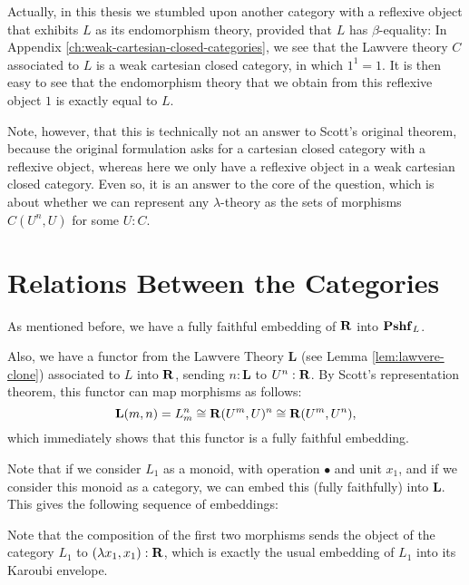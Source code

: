 \begin{remark}
  Actually, in this thesis we stumbled upon another category with a reflexive object that exhibits $ L $ as its endomorphism theory, provided that $ L $ has $ \beta $-equality: In Appendix \ref{ch:weak-cartesian-closed-categories}, we see that the Lawvere theory $ C $ associated to $ L $ is a weak cartesian closed category, in which $ 1^1 = 1 $. It is then easy to see that the endomorphism theory that we obtain from this reflexive object $ 1 $ is exactly equal to $ L $.

  Note, however, that this is technically not an answer to Scott's original theorem, because the original formulation asks for a cartesian closed category with a reflexive object, whereas here we only have a reflexive object in a weak cartesian closed category. Even so, it is an answer to the core of the question, which is about whether we can represent any $ \lambda $-theory as the sets of morphisms $ C(U^n, U) $ for some $ U : C $.
\end{remark}

\section{Relations Between the Categories}\label{sec:hyland-categories}

As mentioned before, we have a fully faithful embedding of $ \mathbf{R} $ into $ \mathbf{Pshf}_{L} $.

Also, we have a functor from the Lawvere Theory $ \mathbf{L} $ (see Lemma \ref{lem:lawvere-clone}) associated to $ L $ into $ \mathbf{R} $, sending $ n : \mathbf L $ to $ U^n : \mathbf{R} $. By Scott's representation theorem, this functor can map morphisms as follows:
\[ \mathbf L(m, n) = L_m^n \cong \mathbf{R}(U^m, U)^n \cong \mathbf{R}(U^m, U^n), \]
which immediately shows that this functor is a fully faithful embedding.

Note that if we consider $ L_1 $ as a monoid, with operation $ \bullet $ and unit $ x_1 $, and if we consider this monoid as a category, we can embed this (fully faithfully) into $ \mathbf L $. This gives the following sequence of embeddings:
\begin{center}
\end{center}

Note that the composition of the first two morphisms sends the object of the category $ L_1 $ to $ (\lambda x_1, x_1) : \mathbf{R} $, which is exactly the usual embedding of $ L_1 $ into its Karoubi envelope.

